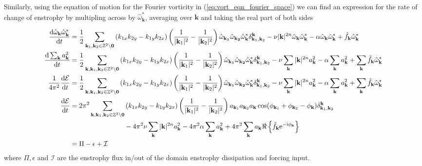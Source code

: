\documentclass[9pt]{article}
\newcommand{\der}[2]{\frac{\mathrm{d}#1}{\mathrm{d}#2}}          	 %
\newcommand{\ii}{\mathrm{i}}      								  %
\newcommand{\e}{\mathrm{e}}      								  %
\newcommand{\omegahat}[1]{\hat{\omega}_{ \mathbf{#1} } }								%
\newcommand{\bfk}{\mathbf{k}}								%
\newcommand{\bfkn}[1]{\mathbf{k}_{#1}}								%
\begin{document}
Similarly, using the equation of motion for the Fourier vorticity in (\ref{eq:vort_eqn_fourier_space}) we can find an expression for the rate of change of enstrophy by multipling across by $\omegahat{k}^*$, averaging over $\bfk$ and taking the real part of both sides

\begin{align}
	\der{\omegahat{k}\omegahat{k}^*}{t} &= \frac{1}{2}	\sum_{\mathbf{k}_1, \mathbf{k}_2\in \mathbb{Z}^2\setminus \mathbf{0}}\left(k_{1x}k_{2y} - k_{1y}k_{2x}\right) \left(\frac{1}{|\bfkn{1}|^2} - \frac{1}{|\bfkn{2}|^2}\right) \omegahat{\bfkn{1}}\omegahat{\bfkn{2}}\omegahat{k}^* \delta_{\bfkn{1}, \bfkn{2}}^{\bfk} - \nu |\bfk|^{2n}\omegahat{k}\omegahat{k}^* - \alpha\omegahat{k}\omegahat{k}^* + \hat{f}_{\bfk} \omegahat{k}^* \notag \\
	\der{\sum_{\bfk} a_{\bfk}^2}{t} &= \frac{1}{2}	\sum_{\bfk, \mathbf{k}_1, \mathbf{k}_2\in \mathbb{Z}^2\setminus \mathbf{0}}\left(k_{1x}k_{2y} - k_{1y}k_{2x}\right) \left(\frac{1}{|\bfkn{1}|^2} - \frac{1}{|\bfkn{2}|^2}\right) \omegahat{\bfkn{1}}\omegahat{\bfkn{2}}\omegahat{k}^* \delta_{\bfkn{1}, \bfkn{2}}^{\bfk} - \nu \sum_{\bfk}|\bfk|^{2n} a_{\bfk}^2 - \alpha\sum_{\bfk} a_{\bfk}^2 + \sum_{\bfk}\hat{f}_{\bfk} \omegahat{k}^* \notag \\
	\frac{1}{4\pi^2}\der{\mathcal{E}}{t} &= \frac{1}{2}	\sum_{\bfk, \mathbf{k}_1, \mathbf{k}_2\in \mathbb{Z}^2\setminus \mathbf{0}}\left(k_{1x}k_{2y} - k_{1y}k_{2x}\right) \left(\frac{1}{|\bfkn{1}|^2} - \frac{1}{|\bfkn{2}|^2}\right) \omegahat{\bfkn{1}}\omegahat{\bfkn{2}}\omegahat{k}^* \delta_{\bfkn{1}, \bfkn{2}}^{\bfk} - \nu \sum_{\bfk}|\bfk|^{2n} a_{\bfk}^2 - \alpha\sum_{\bfk} a_{\bfk}^2 + \sum_{\bfk}\hat{f}_{\bfk} \omegahat{k}^* \notag \\
	\der{\mathcal{E}}{t} &= 2\pi^2	\sum_{\bfk, \mathbf{k}_1, \mathbf{k}_2\in \mathbb{Z}^2\setminus \mathbf{0}}\left(k_{1x}k_{2y} - k_{1y}k_{2x}\right) \left(\frac{1}{|\bfkn{1}|^2} - \frac{1}{|\bfkn{2}|^2}\right) a_{\bfkn{1}} a_{\bfkn{2}} a_{\bfk} \cos(\phi_{\bfkn{1}} + \phi_{\bfkn{2}} - \phi_{\bfk}) \delta_{\bfkn{1}, \bfkn{2}}^{\bfk} \notag \\ & \qquad \qquad \qquad \qquad- 4\pi^2\nu \sum_{\bfk}|\bfk|^{2n} a_{\bfk}^2 - 4\pi^2\alpha\sum_{\bfk} a_{\bfk}^2 + 4\pi^2\sum_{\bfk}a_\bfk\Re\left\{\hat{f}_{\bfk} \e^{-\ii\phi_\bfk}\right\} \notag \\
	&= \Pi - \epsilon + \mathcal{I}
\end{align}
where $\Pi, \epsilon$ and $\mathcal{I}$ are the enstrophy flux in/out of the domain enstrophy dissipation and forcing input.
\end{document}

